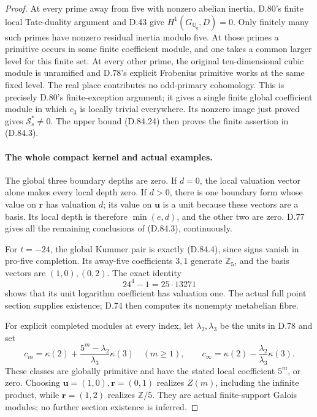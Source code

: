 \begin{proof}
At every prime away from five with nonzero abelian
inertia, D.80's finite local Tate-duality argument and
D.43 give \(H^1(G_{\mathbb Q_q},D)=0\).
Only finitely many such primes have nonzero residual
inertia modulo five. At those primes a primitive occurs
in some finite coefficient module, and one takes a
common larger level for this finite set. At every
other prime, the original ten-dimensional cubic module
is unramified and D.78's explicit Frobenius primitive
works at the same fixed level. The real place contributes
no odd-primary cohomology. This is precisely D.80's
finite-exception argument; it gives a single finite
global coefficient module in which \(c_3\) is locally
trivial everywhere. Its nonzero image just proved gives
\(\mathcal S_s^*\ne0\). The upper bound (D.84.24)
then proves the finite assertion in (D.84.3).

\paragraph{The whole compact kernel and actual examples.}
The global three boundary depths are zero. If \(d=0\),
the local valuation vector alone makes every local
depth zero. If \(d>0\), there is one boundary form
whose value on \(\mathbf r\) has valuation \(d\);
its value on \(\mathbf u\) is a unit because these
vectors are a basis. Its local depth is therefore
\(\min(e,d)\), and the other two are zero. D.77 gives
all the remaining conclusions of (D.84.3), continuously.

For \(t=-24\), the global Kummer pair is exactly
(D.84.4), since signs vanish in pro-five completion.
Its away-five coefficients \(3,1\) generate \(\mathbb Z_5\),
and the basis vectors are \((1,0),(0,2)\).
The exact identity
\[
                      24^4-1=25\cdot13271
\]
shows that its unit logarithm coefficient has valuation
one. The actual full point section supplies existence;
D.74 then computes its nonempty metabelian fibre.

For explicit completed modules at every index, let
\(\lambda_2,\lambda_3\) be the units in D.78 and set
\[
 c_m=\kappa(2)+\frac{5^m-\lambda_2}{\lambda_3}\kappa(3)
       \quad(m\ge1),\qquad
 c_\infty=\kappa(2)-\frac{\lambda_2}{\lambda_3}\kappa(3).
                                                                  \tag{D.84.25}
\]
These classes are globally primitive and have the stated
local coefficient \(5^m\), or zero.
Choosing \(\mathbf u=(1,0),\mathbf r=(0,1)\) realizes
\(Z(m)\), including the infinite product, while
\(\mathbf r=(1,2)\) realizes \(\mathbb Z/5\).
They are actual finite-support Galois modules; no further
section existence is inferred.
\end{proof}

